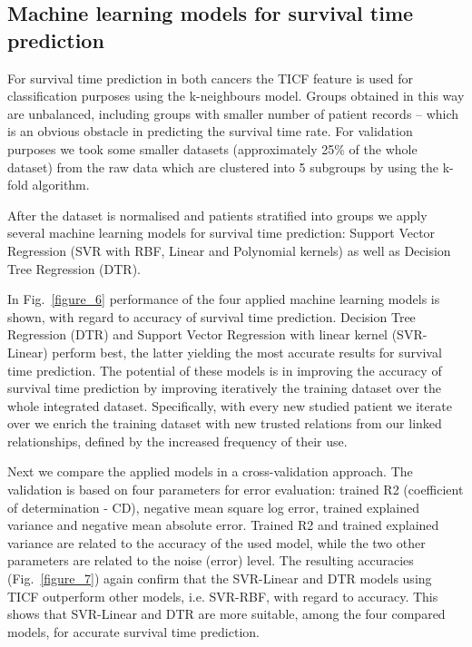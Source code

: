 \documentclass{bmcart}
\begin{document}
\subsection{Machine learning models for survival time prediction}

For survival time prediction in both cancers the TICF feature is used
for classification purposes using the k-neighbours model. Groups
obtained in this way are unbalanced, including groups with smaller
number of patient records -- which is an obvious obstacle in predicting
the survival time rate. For validation purposes we took some smaller
datasets (approximately 25\% of the whole dataset) from the raw data which are clustered into 5 subgroups by
using the k-fold algorithm.

After the dataset is normalised and patients stratified into groups we
apply several machine learning models for survival time prediction:
Support Vector Regression (SVR with RBF, Linear and Polynomial kernels) as
well as Decision Tree Regression (DTR).






In Fig.~\ref{figure_6} performance of the four applied machine learning models is
shown, with regard to accuracy of survival time prediction. Decision
Tree Regression (DTR) and Support Vector Regression with linear kernel
(SVR-Linear) perform best, the latter yielding the most accurate
results for survival time prediction. The potential of these models is
in improving the accuracy of survival time prediction by improving
iteratively the training dataset over the whole integrated dataset.
Specifically, with every new studied patient we iterate over we enrich
the training dataset with new trusted relations from our linked
relationships, defined by the increased frequency of their use. 



Next we compare the applied models in a cross-validation approach. The
validation is based on four parameters for error evaluation: trained R2
(coefficient of determination - CD), negative mean square log error,
trained explained variance and negative mean absolute error. Trained R2
and trained explained variance are related to the accuracy of the used
model, while the two other parameters are related to the noise (error)
level. The resulting accuracies (Fig.~\ref{figure_7}) again confirm that the
SVR-Linear and DTR models using TICF outperform other models, i.e.
SVR-RBF, with regard to accuracy. This shows that SVR-Linear and DTR
are more suitable, among the four compared models, for accurate
survival time prediction.
\end{document}
